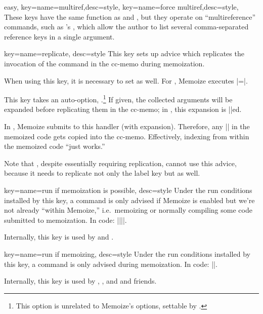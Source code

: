 \documentclass[a4paper,11pt]{article}
\begin{document}
\begin{doc}{easy, 
    key={name=multiref,desc=style},
    key={name=force multiref,desc=style},
  }
  These keys have the same function as  and , but they operate on ``multireference'' commands, such as
  's , which allow the author to list several
  comma-separated reference keys in a single argument.
\end{doc}

\begin{doc}{
    key={name=replicate, desc=style}
  }
  This key sets up advice which replicates the invocation of the command in
  the cc-memo during memoization.

  When using this key, it is necessary to set  as well.  For
  , Memoize executes
  |=\index|.

  This key takes an auto-option, .\footnote{This option is unrelated to Memoize's options,
    settable by .} If given, the collected arguments will be
  expanded before replicating them in the cc-memo; in , this
  expansion is |\protect|ed.

  In , Memoize submits  to this handler (with
  expansion).  Therefore, any || in the memoized code gets copied
  into the cc-memo.  Effectively, indexing from within the memoized code ``just
  works.''

  Note that , despite essentially requiring replication, cannot
  use this advice, because it needs to replicate not only the label key but
   as well.
\end{doc}

\begin{doc}{key={name=run if memoization is possible, desc=style}}
  Under the run conditions installed by this key, a command is only advised if
  Memoize is enabled but we're not already ``within Memoize,'' i.e.\ memoizing
  or normally compiling some code submitted to memoization.  In code:
  |\else||\fi\fi|.

  Internally, this key is used by  and .
\end{doc}

\begin{doc}{key={name=run if memoizing, desc=style}}
  Under the run conditions installed by this key, a command is only advised
  during memoization.  In code:
  |\fi\fi|.
  
  Internally, this key is used by , ,
  and  and friends.
\end{doc}
\end{document}
